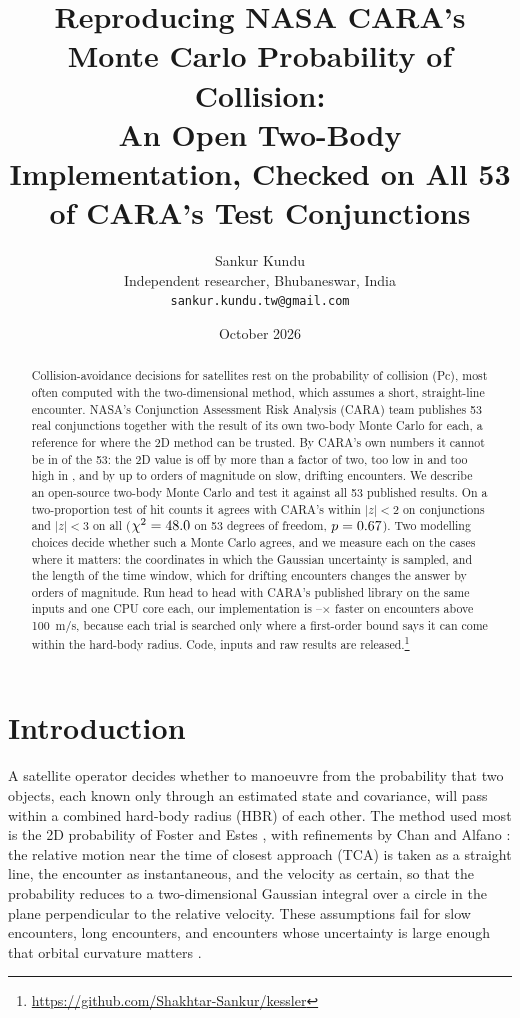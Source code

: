\documentclass[11pt]{article}
\title{Reproducing NASA CARA's Monte Carlo Probability of Collision:\\
An Open Two-Body Implementation, Checked on All 53 of CARA's Test Conjunctions}
\author{Sankur Kundu\\
\small Independent researcher, Bhubaneswar, India\\
\small\texttt{sankur.kundu.tw@gmail.com}}
\date{October 2026}
\newcommand{\x}{$\times$}
\begin{document}
\maketitle

\begin{abstract}
\noindent
Collision-avoidance decisions for satellites rest on the probability of collision (Pc), most
often computed with the two-dimensional method, which assumes a short, straight-line encounter.
NASA's Conjunction Assessment Risk Analysis (CARA) team publishes 53 real conjunctions together
with the result of its own two-body Monte Carlo for each, a reference for where the 2D method
can be trusted. By CARA's own numbers it cannot be in \nOffTwo{} of the 53: the 2D value is off
by more than a factor of two, too low in \nOffLow{} and too high in \nOffHigh{}, and by up to
\nWorstOrders{} orders of magnitude on slow, drifting encounters. We describe an open-source
two-body Monte Carlo and test it against all 53 published results. On a two-proportion test of
hit counts it agrees with CARA's within $|z|<2$ on \nWithinTwo{} conjunctions and $|z|<3$ on
all \nWithinThree{} ($\chi^2=48.0$ on 53 degrees of freedom, $p=0.67$). Two modelling
choices decide whether such a Monte Carlo agrees, and we measure each on the cases where it
matters: the coordinates in which the Gaussian uncertainty is sampled, and the length of the
time window, which for drifting encounters changes the answer by orders of magnitude. Run head to head with CARA's
published library on the same inputs and one CPU core each, our implementation is
\nLibSpeedMin--\nLibSpeedMax\x{} faster on encounters above 100~m/s, because each trial is
searched only where a first-order bound says it can come within the hard-body radius. Code,
inputs and raw results are released.\footnote{\url{https://github.com/Shakhtar-Sankur/kessler}}
\end{abstract}

\section{Introduction}

A satellite operator decides whether to manoeuvre from the probability that two objects,
each known only through an estimated state and covariance, will pass within a combined
hard-body radius (HBR) of each other. The method used most is the 2D probability of Foster and
Estes \cite{foster1992}, with refinements by Chan \cite{chan2008} and Alfano \cite{alfano2005}:
the relative motion near the time of closest approach (TCA) is taken as a straight line, the
encounter as instantaneous, and the velocity as certain, so that the probability reduces to a
two-dimensional Gaussian integral over a circle in the plane perpendicular to the relative
velocity. These assumptions fail for slow encounters, long encounters, and encounters whose
uncertainty is large enough that orbital curvature matters \cite{coppola2012,hall2021}.
\end{document}
